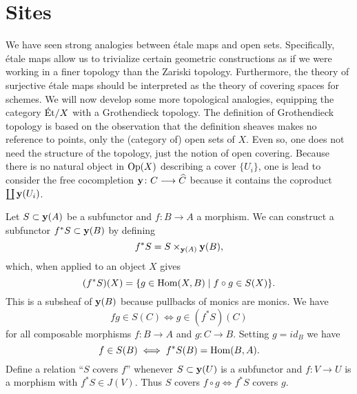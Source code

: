 \section{Sites}
We have seen strong analogies between \'etale maps and open sets. Specifically, \'etale maps allow us to trivialize certain geometric constructions as if we were working in a finer topology than the Zariski topology. Furthermore, the theory of surjective \'etale maps should be interpreted as the theory of covering spaces for schemes. We will now develop some more topological analogies, equipping the category $\text{\'Et}/X$ with a Grothendieck topology. The definition of Grothendieck topology is based on the observation that the definition sheaves makes no reference to points, only the (category of) open sets of $X$. Even so, one does not need the structure of the topology, just the notion of open covering. Because there is no natural object in $\operatorname{Op}(X)$ describing a cover $\{U_i\}$, one is lead to consider the free cocompletion $\mathbf{y} \colon C \longrightarrow \widehat{C}$ because it contains the coproduct $\coprod \mathbf{y}(U_i)$.

Let $S \subset \mathbf{y}(A)$ be a subfunctor and $f \colon B \to A$ a morphism. We can construct a subfunctor $f^*S \subset \mathbf{y}(B)$ by defining
\[
	f^*S = S \times_{\mathbf{y}(A)} \mathbf{y}(B),
\]
which, when applied to an object $X$ gives
\[
	(f^*S)(X) = \{g \in \operatorname{Hom}(X,B) \mid f \circ g \in S(X)\}.
\]
This is a subsheaf of $\mathbf{y}(B)$ because pullbacks of monics are monics. We have
\[
	fg \in S(C) \iff g \in (f^*S)(C)
\]
for all composable morphisms $f \colon  B \to A$ and $g \colon C \to B$. Setting $g = id_B$ we have
\[
	f \in S(B) \iff f^*S(B) = \operatorname{Hom}(B,A).
\]
Define a relation ``$S$ covers $f$'' whenever $S \subset \mathbf{y}(U)$ is a subfunctor and $f \colon V \to U$ is a morphism with $f^*S \in J(V)$. Thus $S$ covers $f \circ g \iff f^*S$ covers $g$.

